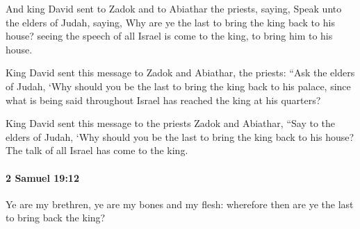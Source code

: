			\begin{versebox}
					\item[BHS] 
					\item[ASV] And king David sent to Zadok and to Abiathar the priests, saying, Speak unto the elders of Judah, saying, Why are ye the last to bring the king back to his house? seeing the speech of all Israel is come to the king, to bring him to his house.
					\item[NIV] King David sent this message to Zadok and Abiathar, the priests: “Ask the elders of Judah, ‘Why should you be the last to bring the king back to his palace, since what is being said throughout Israel has reached the king at his quarters?
					\item[NRSV] King David sent this message to the priests Zadok and Abiathar, “Say to the elders of Judah, ‘Why should you be the last to bring the king back to his house? The talk of all Israel has come to the king.
			\end{versebox}

		\paragraph{2 Samuel 19:12} %
			\label{2SAMUEL-19-12}

			Ye are my brethren, ye are my bones and my flesh: wherefore then are ye the last to bring back the king?

